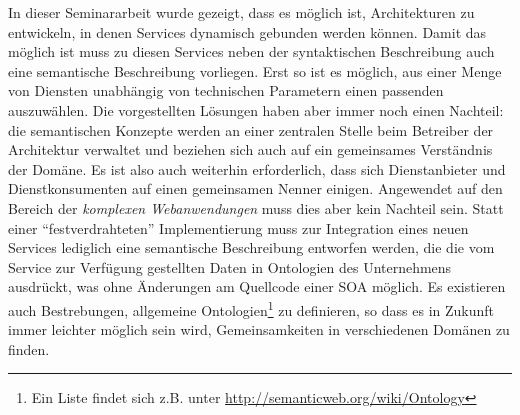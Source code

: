 In dieser Seminararbeit wurde gezeigt, dass es möglich ist, Architekturen zu entwickeln, in denen Services dynamisch gebunden werden können. Damit das möglich ist muss zu diesen Services neben der syntaktischen Beschreibung auch eine semantische Beschreibung vorliegen. Erst so ist es möglich, aus einer Menge von Diensten unabhängig von technischen Parametern einen passenden auszuwählen. Die vorgestellten Lösungen haben aber immer noch einen Nachteil: die semantischen Konzepte werden an einer zentralen Stelle beim Betreiber der Architektur verwaltet und beziehen sich auch auf ein gemeinsames Verständnis der Domäne. Es ist also auch weiterhin erforderlich, dass sich Dienstanbieter und Dienstkonsumenten auf einen gemeinsamen Nenner einigen. 
Angewendet auf den Bereich der \emph{komplexen Webanwendungen} muss dies aber kein Nachteil sein. Statt einer "`festverdrahteten"' Implementierung muss zur Integration eines neuen Services lediglich eine semantische Beschreibung entworfen werden, die die vom Service zur Verfügung gestellten Daten in Ontologien des Unternehmens ausdrückt, was ohne Änderungen am Quellcode einer \ac{SOA} möglich. Es existieren auch Bestrebungen, allgemeine Ontologien\footnote{Ein Liste findet sich z.B. unter \url{http://semanticweb.org/wiki/Ontology}} zu definieren, so dass es in Zukunft immer leichter möglich sein wird, Gemeinsamkeiten in verschiedenen Domänen zu finden.